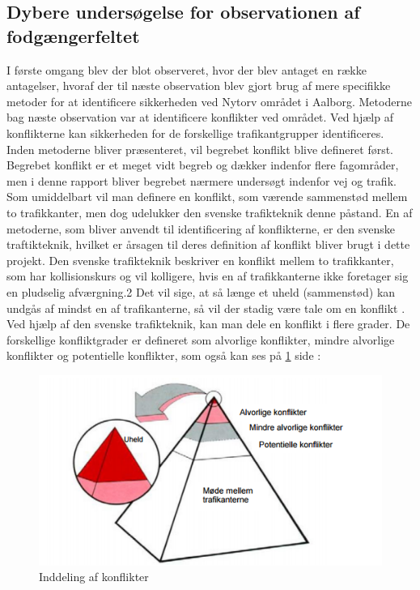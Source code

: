 \subsection{Dybere undersøgelse for observationen af fodgængerfeltet}
\label{sub:dyb_undersoelse}
I første omgang blev der blot observeret, hvor der blev antaget en række antagelser, hvoraf der til næste observation blev gjort brug af mere specifikke metoder for at identificere sikkerheden ved Nytorv området i Aalborg.
Metoderne bag næste observation var at identificere konflikter ved området. Ved hjælp af konflikterne kan sikkerheden for de forskellige trafikantgrupper identificeres. Inden metoderne bliver præsenteret, vil begrebet konflikt blive defineret først. Begrebet konflikt er et meget vidt begreb og dækker indenfor flere fagområder, men i denne rapport bliver begrebet nærmere undersøgt indenfor vej og trafik. Som umiddelbart vil man definere en konflikt, som værende sammenstød mellem to trafikkanter, men dog udelukker den svenske trafikteknik denne påstand. \autocite{sweconflict}
En af metoderne, som bliver anvendt til identificering af konflikterne, er den svenske traftikteknik, hvilket er årsagen til deres definition af konflikt bliver brugt i dette projekt.
Den svenske trafikteknik beskriver en konflikt mellem to trafikkanter, som har kollisionskurs og vil kolligere, hvis en af trafikkanterne ikke foretager sig en pludselig afværgning.2 Det vil sige, at så længe et uheld (sammenstød) kan undgås af mindst en af trafikanterne, så vil der stadig være tale om en konflikt \autocite{sweconflict}. Ved hjælp af den svenske trafikteknik, kan man dele en konflikt i flere grader. De forskellige konfliktgrader er defineret som alvorlige konflikter, mindre alvorlige konflikter og potentielle konflikter, som også kan ses på \cref{fig:indellingkonflikter} side \pageref{fig:indellingkonflikter}:
 \begin{figure}[htbp]
   \centering
   \begin{adjustbox}{max width=\textwidth}
     \includegraphics{figures/Billederogfigur/konflikt.png} %
  \end{adjustbox}
   \caption{Inddeling af konflikter \autocite{konfli}}
    \label{fig:indellingkonflikter}
 \end{figure}
 \newpage


